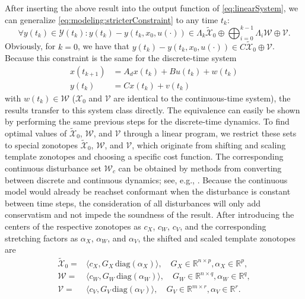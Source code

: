 \documentclass[EPiC]{easychair}
\renewcommand{\^}[1]{^{(#1)}}
\begin{document}
After inserting the above result into the output function of \eqref{eq:linearSystem}, we can generalize \eqref{eq:modeling:stricterConstraint} to any time $t_k$:
\begin{equation}
    \label{eq:combinedConstraint}
	\forall y(t_k) \in \mathcal{Y}(t_k): y(t_k) - y(t_k,x_0,u(\cdot)) \in \Lambda_k \tilde{\mathcal{X}}_0 \oplus \bigoplus_{i=0}^{k-1}  \Lambda_i \mathcal{W} \oplus \mathcal{V}. 
\end{equation}
Obviously, for $k=0$, we have that $y(t_k) - y(t_k,x_0,u(\cdot)) \in C \tilde{\mathcal{X}}_0 \oplus \mathcal{V}$. 
Because this constraint is the same for the discrete-time system
\begin{equation*}
\begin{split}
 x(t_{k+1}) &=  A_d x(t_k) + B u(t_k) + w(t_k) \\
 y(t_k) &= C x(t_k) + v(t_k)
\end{split}
\end{equation*}
with $w(t_k) \in \mathcal{W}$ ($\mathcal{X}_0$ and $\mathcal{V}$ are identical to the continuous-time system), the results transfer to this system class directly. The equivalence can easily be shown by performing the same previous steps for the discrete-time dynamics. To find optimal values of $\tilde{\mathcal{X}}_0$, $\mathcal{W}$, and $\mathcal{V}$ through a linear program, we restrict these sets to special zonotopes $\tilde{\mathcal{X}}_0$, $\mathcal{W}$, and $\mathcal{V}$, which originate from shifting and scaling template zonotopes and choosing a specific cost function. The corresponding continuous disturbance set $\mathcal{W}_c$ can be obtained by methods from converting between discrete and continuous dynamics; see, e.g., \cite{Shieh1980}. Because the continuous model would already be reachset conformant when the disturbance is constant between time steps, the consideration of all disturbances will only add conservatism and not impede the soundness of the result. After introducing the centers of the respective zonotopes as $c_X$, $c_W$, $c_V$, and the corresponding stretching factors as $\alpha_X$, $\alpha_W$, and $\alpha_V$, the shifted and scaled template zonotopes are 
\begin{equation} \label{eq:zonotopeTemplates}
 \begin{split}
  \tilde{\mathcal{X}}_0 =& \langle c_X, G_X \, \mathrm{diag}(\alpha_X) \rangle, \quad G_X \in\mathbb{R}^{n \times p}, \alpha_X \in \mathbb{R}^p, \\
  \mathcal{W} =& \langle c_W, G_W \, \mathrm{diag}(\alpha_W)\rangle, \quad G_W \in\mathbb{R}^{n \times q}, \alpha_W \in \mathbb{R}^q, \\
  \mathcal{V} =& \langle c_V, G_V \, \mathrm{diag}(\alpha_V) \rangle, \quad G_V \in\mathbb{R}^{m \times r}, \alpha_V \in \mathbb{R}^r. \\
 \end{split}
\end{equation}
\end{document}
